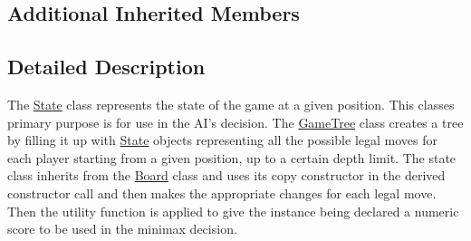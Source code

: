 \subsection*{Additional Inherited Members}


\subsection{Detailed Description}
The \hyperlink{class_state}{State} class represents the state of the game at a given position. This classes primary purpose is for use in the A\-I's decision. The \hyperlink{class_game_tree}{Game\-Tree} class creates a tree by filling it up with \hyperlink{class_state}{State} objects representing all the possible legal moves for each player starting from a given position, up to a certain depth limit. The state class inherits from the \hyperlink{class_board}{Board} class and uses its copy constructor in the derived constructor call and then makes the appropriate changes for each legal move. Then the utility function is applied to give the instance being declared a numeric score to be used in the minimax decision. 

